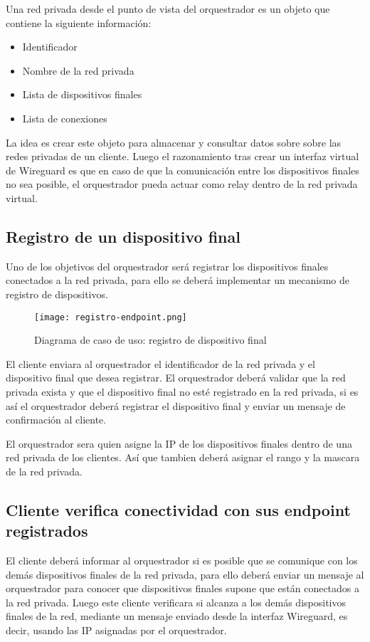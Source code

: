 Una red privada desde el punto de vista del orquestrador es un objeto que contiene la siguiente información:
\begin{itemize}
    \item Identificador
    \item Nombre de la red privada
    \item Lista de dispositivos finales
    \item Lista de conexiones
\end{itemize}

La idea es crear este objeto para almacenar y consultar datos sobre sobre las redes privadas de un cliente.
Luego el razonamiento tras crear un interfaz virtual de Wireguard es que en caso de que la comunicación entre los dispositivos finales no sea posible, el orquestrador pueda actuar como relay dentro de la red privada virtual.


\subsection{Registro de un dispositivo final}
Uno de los objetivos del orquestrador será registrar los dispositivos finales conectados a la red privada, para ello se deberá implementar un mecanismo de registro de dispositivos.

\begin{figure}[h!]
    \centering
    \texttt{[image: registro-endpoint.png]}
    \caption{Diagrama de caso de uso: registro de dispositivo final}
\end{figure}

El cliente enviara al orquestrador el identificador de la red privada y el dispositivo final que desea registrar.
El orquestrador deberá validar que la red privada exista y que el dispositivo final no esté registrado en la red privada, si es así el orquestrador deberá registrar el dispositivo final y enviar un mensaje de confirmación al cliente.

El orquestrador sera quien asigne la IP de los dispositivos finales dentro de una red privada de los clientes. Así que tambien deberá asignar el rango y la mascara de la red privada. 

\newpage
\subsection{Cliente verifica conectividad con sus endpoint registrados}
El cliente deberá informar al orquestrador si es posible que se comunique con los demás dispositivos finales de la red privada, para ello deberá enviar un mensaje al orquestrador para conocer que dispositivos finales supone que están conectados a la red privada.
Luego este cliente verificara si alcanza a los demás dispositivos finales de la red, mediante un mensaje enviado desde la interfaz Wireguard, es decir, usando las IP asignadas por el orquestrador.

